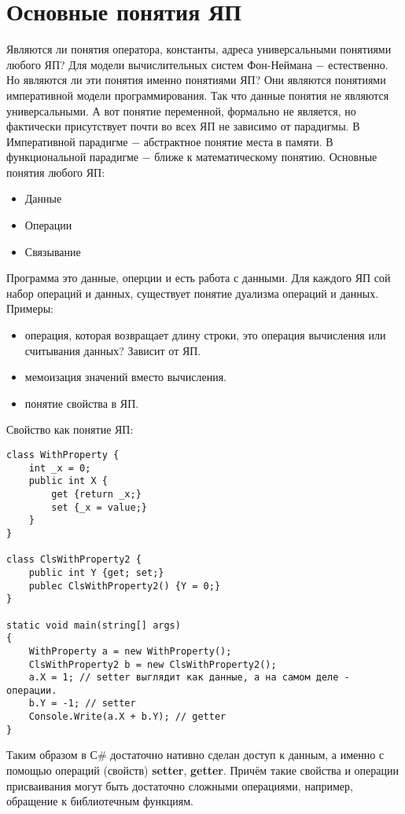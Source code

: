 \documentclass[a4paper, 12pt, titlepage, finall]{extreport}
\begin{document}
    \chapter{Основные понятия ЯП}
        Являются ли понятия оператора, константы, адреса универсальными понятиями любого ЯП?
        Для модели вычислительных систем Фон-Неймана $-$ естественно. Но являются ли эти понятия именно понятиями ЯП?
        Они являются понятиями императивной модели программирования. Так что данные понятия не являются универсальными.
        А вот понятие переменной, формально не является, но фактически присутствует почти во всех ЯП не зависимо от парадигмы.
        В Императивной парадигме $-$ абстрактное понятие места в памяти.
        В функциональной парадигме $-$ ближе к математическому понятию. 
        Основные понятия любого ЯП:
        \begin{itemize}
            \item Данные
            \item Операции
            \item Связывание
        \end{itemize}

        Программа это данные, оперции и есть работа с данными. Для каждого ЯП сой набор операций и данных, существует
        понятие дуализма операций и данных.
        Примеры:
        \begin{itemize}
            \item операция, которая возвращает длину строки, это операция вычисления или считывания данных? Зависит от ЯП.
            \item мемоизация значений вместо вычисления.
            \item понятие свойства в ЯП.
        \end{itemize}

        Свойство как понятие ЯП:
\begin{lstlisting}
class WithProperty {
    int _x = 0;
    public int X {
        get {return _x;}
        set {_x = value;}
    }
}

class ClsWithProperty2 {
    public int Y {get; set;}
    publec ClsWithProperty2() {Y = 0;}
}

static void main(string[] args)
{
    WithProperty a = new WithProperty();
    ClsWithProperty2 b = new ClsWithProperty2();
    a.X = 1; // setter выглядит как данные, а на самом деле - операции.
    b.Y = -1; // setter
    Console.Write(a.X + b.Y); // getter
}
\end{lstlisting}
        Таким образом в С\# достаточно нативно сделан доступ к данным, а именно с помощью операций (свойств) \textbf{setter}, \textbf{getter}.
        Причём такие свойства и операции присваивания могут быть достаточно сложными операциями, например, обращение к библиотечным функциям.
\end{document}

